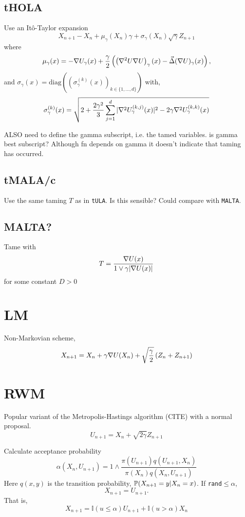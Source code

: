 \subsection{tHOLA}
\cite{tHOLA}
Use an It\^o-Taylor expansion 
\[X_{n+1} - X_n + \mu_{\gamma}(X_n)\gamma +\sigma_{\gamma}(X_n)\sqrt{\gamma}Z_{n+1}\]
where 
\[\mu_{\gamma}(x) = -\grad U_{\gamma}(x) +\frac{\gamma}{2}\left( \left( \grad^2U\grad U\right)_{\gamma}(x) - \vec{\Delta}(\grad U)_{\gamma}(x)\right) ,\]
and \(\sigma_{\gamma}(x) = \text{diag}\left(\left( \sigma_{\gamma}^{(k)}(x)\right)_{k\in \lbrace 1,\dots,d\rbrace}\right)\) with,
\[\sigma_{\gamma}^{(k)}(x) = \sqrt{2+\frac{2\gamma^2}{3}\sum_{j=1}^d |\grad^2 U_{\gamma}^{(k,j)}(x)|^2 - 2\gamma \grad^2 U_{\gamma}^{(k,k)}(x)}\]

ALSO need to define the gamma subscript, i.e. the tamed variables. is gamma best subscript? Although fn depends on gamma it doesn't indicate that taming has occurred.
\subsection{tMALA/c}
Use the same taming \(T\) as in \texttt{tULA}. Is this sensible? Could compare with \texttt{MALTA}.
\subsection{MALTA?}\cite{MALTA}
Tame with 
\[T = \frac{ \grad U(x)}{1\vee \gamma |\grad U(x)|}\]
for some constant \(D>0\)
\section{LM}
\cite{LM}
Non-Markovian scheme,
\[X_{n+1} = X_n +\gamma \grad U(X_n) + \sqrt{\frac{\gamma}{2}} \left(Z_n + Z_{n+1}\right) \]
\section{RWM}
Popular variant of the Metropolis-Hastings algorithm (CITE) with a normal proposal. 
\[U_{n+1} = X_n + \sqrt{2\gamma} Z_{n+1}\]

Calculate acceptance probability
\[\alpha(X_n,U_{n+1}) = 1\wedge \frac{\pi(U_{n+1})q(U_{n+1},X_n)}{\pi(X_n)q(X_n,U_{n+1})}\]
Here \(q(x,y)\) is the transition probability, \(\P(X_{n+1}=y | X_{n}=x)\). If \texttt{rand}\(\leq\alpha\), 
\[X_{n+1} = U_{n+1}.\]
That is,
\[X_{n+1} = \mathbb{I}(u\leq \alpha)U_{n+1} +\mathbb{I}(u > \alpha)X_n \] 


